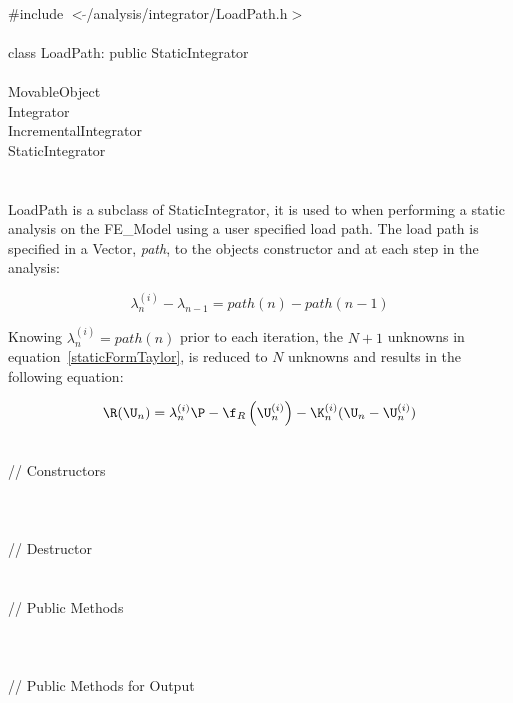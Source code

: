 
   \\
\indent \#include $<\tilde{ }$/analysis/integrator/LoadPath.h$>$  \\

  \\
\indent class LoadPath: public StaticIntegrator  \\

 \\
\indent MovableObject \\
\indent\indent Integrator \\
\indent\indent\indent IncrementalIntegrator \\
\indent\indent\indent\indent StaticIntegrator \\
\indent\indent\indent\indent{} \\

 \\ 
\indent LoadPath is a subclass of StaticIntegrator, it is
used to when performing a static analysis on the FE\_Model using a
user specified load path. The load path is specified in a Vector, {\em
path}, to the objects constructor and at each step in the analysis:

\[ 
\lambda_n^{(i)} - \lambda_{n-1} = path(n) - path(n-1)
\]

Knowing $\lambda_n^{(i)} = path(n)$ prior to each iteration, the $N+1$
unknowns in equation~\ref{staticFormTaylor}, is reduced to $N$ unknowns and
results in the following equation:

\begin{equation} 
\R(\U_{n}) = \lambda_n^{(i)} \P 
 - \f_{R}\left(\U_{n}^{(i)} \right) - 
\K_n^{(i)} 
(\U_{n} - \U_{n}^{(i)})  
\label{staticFormLoadPath}
\end{equation} 

 \\
\indent // Constructors \\
\\ 
\\ \\
\indent // Destructor \\
\\  \\
\indent // Public Methods \\
 \\
 \\ \\
\indent // Public Methods for Output\\
\\ 
\\ 
\\

